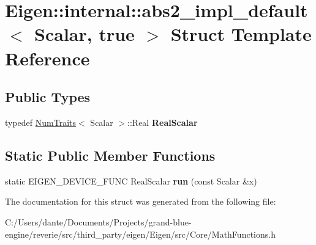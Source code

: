 \hypertarget{struct_eigen_1_1internal_1_1abs2__impl__default_3_01_scalar_00_01true_01_4}{}\section{Eigen\+::internal\+::abs2\+\_\+impl\+\_\+default$<$ Scalar, true $>$ Struct Template Reference}
\label{struct_eigen_1_1internal_1_1abs2__impl__default_3_01_scalar_00_01true_01_4}
\subsection*{Public Types}
\begin{DoxyCompactItemize}
\item 
\mbox{\label{struct_eigen_1_1internal_1_1abs2__impl__default_3_01_scalar_00_01true_01_4_a36a5b9f72f5956e9e52abf4fdaf00c75}} 
typedef \mbox{\hyperlink{struct_eigen_1_1_num_traits}{Num\+Traits}}$<$ Scalar $>$\+::Real {\bfseries Real\+Scalar}
\end{DoxyCompactItemize}
\subsection*{Static Public Member Functions}
\begin{DoxyCompactItemize}
\item 
\mbox{\label{struct_eigen_1_1internal_1_1abs2__impl__default_3_01_scalar_00_01true_01_4_a1bb7745db97124975fa3f8b974b3ed66}} 
static E\+I\+G\+E\+N\+\_\+\+D\+E\+V\+I\+C\+E\+\_\+\+F\+U\+NC Real\+Scalar {\bfseries run} (const Scalar \&x)
\end{DoxyCompactItemize}


The documentation for this struct was generated from the following file\+:\begin{DoxyCompactItemize}
\item 
C\+:/\+Users/dante/\+Documents/\+Projects/grand-\/blue-\/engine/reverie/src/third\+\_\+party/eigen/\+Eigen/src/\+Core/Math\+Functions.\+h\end{DoxyCompactItemize}
